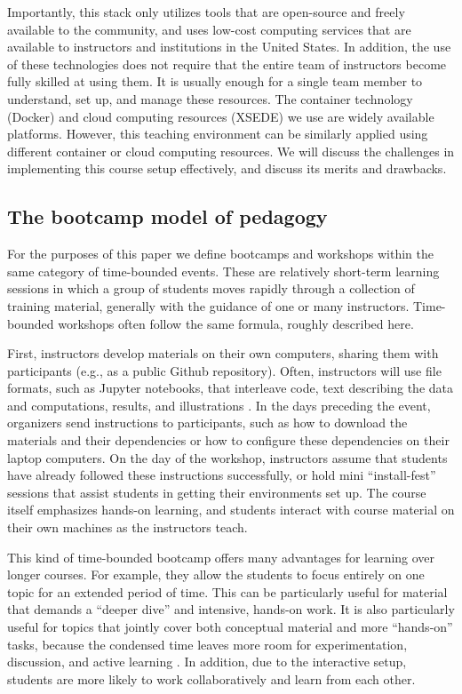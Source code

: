 Importantly, this stack only utilizes tools that are
open-source and freely available to
the community, and uses low-cost computing services that are available
to instructors and institutions in the United States. In addition, the
use of these technologies does not require that the entire
team of instructors become fully skilled at using them. It is
usually enough for a single team member to understand, set up, and manage these resources.
The container technology (Docker) and cloud
computing resources (XSEDE) we use are widely available platforms.
However, this teaching environment can be similarly applied using
different container or cloud computing resources.
We will discuss the challenges in implementing this course
setup effectively, and discuss its merits and drawbacks.

\subsection{The bootcamp model of pedagogy}

For the purposes of this paper we define bootcamps and workshops within
the same category of time-bounded events. These are relatively short-term
learning sessions in which a group of students moves rapidly through a
collection of training material, generally with the guidance of one
or many instructors. Time-bounded workshops often follow the same
formula, roughly described here.

First, instructors develop materials on their own computers, sharing them with
participants (e.g., as a public Github repository). Often, instructors will use
file formats, such as Jupyter notebooks, that
interleave code, text describing the
data and computations, results, and illustrations
\cite{kluyver2016jupyter}. In the days preceding the event, organizers send
instructions to participants, such as how to download the materials and their
dependencies or how to configure these dependencies on their
laptop computers. On the day of the workshop, instructors assume that
students have already followed these instructions successfully, or hold
mini ``install-fest'' sessions that assist students in
getting their environments set up. The course itself emphasizes hands-on
learning, and students interact with course material on their own
machines as the instructors teach.

This kind of time-bounded bootcamp offers many advantages for learning over
longer courses. For example, they allow the students to focus
entirely on one topic for an extended period of time. This can be particularly
useful for material that demands a ``deeper dive'' and intensive, hands-on
work. It is also particularly useful for topics that jointly
cover both conceptual material and more ``hands-on'' tasks, because the
condensed time leaves more room for experimentation, discussion, and active
learning \citep{Bransford2000-lu, Papert1980-fh}. In addition, due to the
interactive setup, students are more likely to work collaboratively and learn
from each other.

